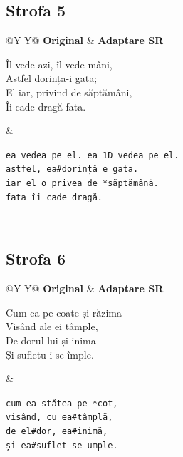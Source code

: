 \documentclass[12pt,onecolumn,letterpaper]{article}
\newcommand{\rs}[1]{\texttt{#1}}
\begin{document}
\subsection*{Strofa 5}
\noindent
\begin{tabularx}{\linewidth}{@{}Y Y@{}}
\textbf{Original} & \textbf{Adaptare SR} \\
\begin{minipage}[t]{\linewidth}\vspace{0pt}
Îl vede azi, îl vede mâni,\\
Astfel dorința-i gata;\\
El iar, privind de săptămâni,\\
Îi cade dragă fata.
\end{minipage}
&
\begin{minipage}[t]{\linewidth}\vspace{0pt}
\rs{ea vedea pe el. ea 1D vedea pe el.}\\
\rs{astfel, ea\#dorință e gata.}\\
\rs{iar el o privea de *săptămână.}\\
\rs{fata îi cade dragă.}
\end{minipage}
\\
\end{tabularx}

\subsection*{Strofa 6}
\noindent
\begin{tabularx}{\linewidth}{@{}Y Y@{}}
\textbf{Original} & \textbf{Adaptare SR} \\
\begin{minipage}[t]{\linewidth}\vspace{0pt}
Cum ea pe coate-și răzima\\
Visând ale ei tâmple,\\
De dorul lui și inima\\
Și sufletu-i se împle.
\end{minipage}
&
\begin{minipage}[t]{\linewidth}\vspace{0pt}
\rs{cum ea stătea pe *cot,}\\
\rs{visând, cu ea\#tâmplă,}\\
\rs{de el\#dor, ea\#inimă,}\\
\rs{și ea\#suflet se umple.}
\end{minipage}
\\
\end{tabularx}
\end{document}
